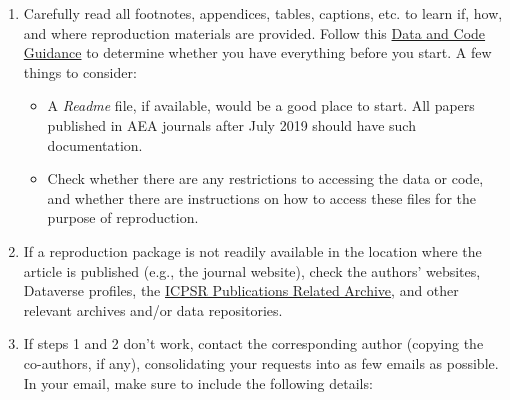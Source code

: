 \documentclass[]{book}
\providecommand{\tightlist}{%
  \setlength{\itemsep}{0pt}\setlength{\parskip}{0pt}}
\begin{document}
\begin{enumerate}
\def\labelenumi{\arabic{enumi}.}
\item
  Carefully read all footnotes, appendices, tables, captions, etc. to learn if, how, and where reproduction materials are provided. Follow this \href{https://social-science-data-editors.github.io/guidance/Verification_guidance.html}{Data and Code Guidance} to determine whether you have everything before you start. A few things to consider:

  \begin{itemize}
  \tightlist
  \item
    A \emph{Readme} file, if available, would be a good place to start. All papers published in AEA journals after July 2019 should have such documentation.\\
  \item
    Check whether there are any restrictions to accessing the data or code, and whether there are instructions on how to access these files for the purpose of reproduction.
  \end{itemize}
\item
  If a reproduction package is not readily available in the location where the article is published (e.g., the journal website), check the authors' websites, Dataverse profiles, the \href{https://www.icpsr.umich.edu/icpsrweb/}{ICPSR Publications Related Archive}, and other relevant archives and/or data repositories.
\item
  If steps 1 and 2 don't work, contact the corresponding author (copying the co-authors, if any), consolidating your requests into as few emails as possible. In your email, make sure to include the following details:


\end{enumerate}
\end{document}
